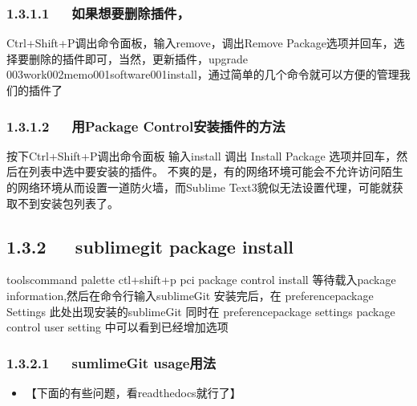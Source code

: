\documentclass[letterpaper,12pt,english]{sphinxmanual}
\begin{document}
\subsubsection{1.3.1.1   如果想要删除插件，}
\label{\detokenize{001software/001install/sublime:id2}}
\begin{sphinxVerbatim}[commandchars=\\\{\}]
Ctrl+Shift+P调出命令面板，输入remove，调出Remove Package选项并回车，选择要删除的插件即可，当然，更新插件，upgrade \PYGZbs{}003work\PYGZbs{}002memo\PYGZbs{}001software\PYGZbs{}001install，通过简单的几个命令就可以方便的管理我们的插件了
\end{sphinxVerbatim}


\subsubsection{1.3.1.2   用Package Control安装插件的方法}
\label{\detokenize{001software/001install/sublime:package-control}}
\begin{sphinxVerbatim}[commandchars=\\\{\}]
按下Ctrl+Shift+P调出命令面板
输入install 调出 Install Package 选项并回车，然后在列表中选中要安装的插件。
不爽的是，有的网络环境可能会不允许访问陌生的网络环境从而设置一道防火墙，而Sublime Text3貌似无法设置代理，可能就获取不到安装包列表了。
\end{sphinxVerbatim}


\subsection{1.3.2   sublimegit package install}
\label{\detokenize{001software/001install/sublime:sublimegit-package-install}}
\begin{sphinxVerbatim}[commandchars=\\\{\}]
tools\PYGZhy{}command palette ctl+shift+p
pci package control install
等待载入package information,然后在命令行输入sublimeGit
安装完后，在
preference\PYGZhy{}\PYGZgt{}package Settings\PYGZhy{}\PYGZgt{} 此处出现安装的sublimeGit
同时在
preference\PYGZhy{}\PYGZgt{}package settings\PYGZhy{}\PYGZgt{} package control \PYGZhy{}\PYGZgt{} user setting 中可以看到已经增加选项
\end{sphinxVerbatim}


\subsubsection{1.3.2.1   sumlimeGit usage用法}
\label{\detokenize{001software/001install/sublime:sumlimegit-usage}}
\begin{itemize}
\item {} 
【下面的有些问题，看readthedocs就行了】

\end{itemize}
\end{document}
